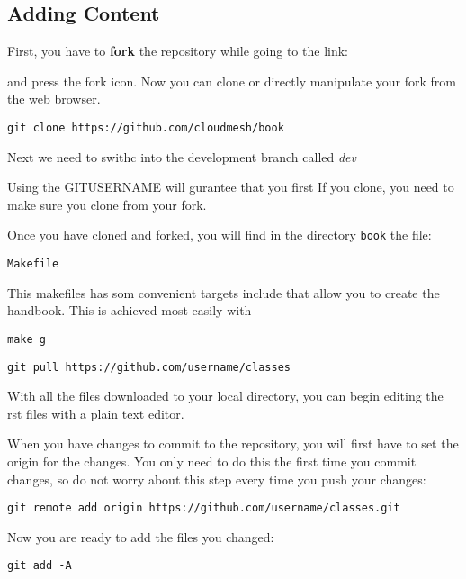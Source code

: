 \subsection{Adding Content}

First, you have to \textbf{fork} the repository while going to the link:


and press the fork icon. Now you can clone or directly manipulate your
fork from the web browser. 

\begin{verbatim}
git clone https://github.com/cloudmesh/book
\end{verbatim}

Next we need to swithc into the development branch called \textit{dev}

Using the GITUSERNAME will gurantee that you first If you clone, you need to make sure you clone
from your fork.

Once you have cloned and forked, you will find in the directory
\verb|book| the file:

\begin{verbatim}
Makefile
\end{verbatim}

This makefiles has som convenient targets include that allow you to
create the handbook. This is achieved most easily with

\begin{verbatim}
make g
\end{verbatim}


\begin{verbatim}
git pull https://github.com/username/classes
\end{verbatim}

With all the files downloaded to your local directory, you can begin
editing the rst files with a plain text editor.

When you have changes to commit to the repository, you will first have
to set the origin for the changes. You only need to do this the first
time you commit changes, so do not worry about this step every time you
push your changes:

\begin{verbatim}
git remote add origin https://github.com/username/classes.git
\end{verbatim}

Now you are ready to add the files you changed:

\begin{verbatim}
git add -A
\end{verbatim}

